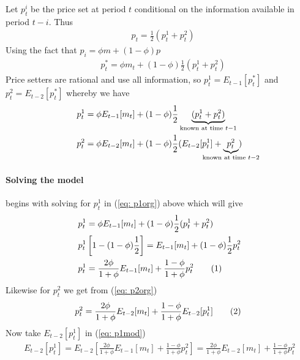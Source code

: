 \documentclass[12pt, a4paper]{article}
\begin{document}
\begin{spacing}{1.213}
Let $p_t^i$ be the price set at period $t$ conditional on the information available in period $t-i$. Thus
\begin{align*}
&p_t = \frac{1}{2}(p_t^1 + p_t^2)
\end{align*}
Using the fact that $p_i = \phi m + (1-\phi) p$
\begin{align*}
& p_t^* = \phi m_t + (1-\phi)\frac{1}{2}(p_t^1 + p_t^2)
\end{align*}
Price setters are rational and use all information, so $p_t^1 = E_{t-1}[p_t^*]$ and $p_t^2 = E_{t-2}[p_t^*]$ whereby we have
\begin{align}
&p_t^1 = \phi E_{t-1}[m_t] + (1-\phi) \frac{1}{2} \underbrace{(p_t^1 + p_t^2)}_{\textrm{known at time }t-1} \label{eq: p1org} \\
& p_t^2 = \phi E_{t-2}[m_t] + (1-\phi) \frac{1}{2} (E_{t-2}[p_t^1] +\underbrace{ p_t^2}_{\mathclap{\textrm{known at time }t-2}}) \label{eq: p2org}
\end{align}
\paragraph{Solving the model} begins with solving for $p_t^1$ in (\ref{eq: p1org}) above which will give
\begin{align*}
&p_t^1 = \phi E_{t-1}[m_t] + (1-\phi) \frac{1}{2} (p_t^1 + p_t^2) \\
& p_t^1 \left[
1- (1-\phi)\frac{1}{2}
\right] = E_{t-1}[m_t] + (1-\phi) \frac{1}{2}  p_t^2 \\
& p_t^1 = \frac{2\phi}{1+\phi} E_{t-1}[m_t] + \frac{1-\phi}{1+\phi} p_t^2
  \stepcounter{equation}\tag{\theequation}\label{eq: p1mod}\
\end{align*}
Likewise for $p_t^2$ we get from (\ref{eq: p2org})
\begin{align*}
p_t^2 = \frac{2\phi}{1+\phi} E_{t-2}[m_t] + \frac{1-\phi}{1+\phi} E_{t-2}[p_t^1]   \stepcounter{equation}\tag{\theequation}\label{eq: p2mod}\
\end{align*}
Now take $E_{t-2}[p_t^1]$ in (\ref{eq: p1mod})
\begin{align*}
E_{t-2}[p_t^1] = E_{t-2}
\left[
\frac{2 \phi}{1+\phi} E_{t-1}[m_t] + \frac{1-\phi}{1+\phi} p_t^2
\right]
= \frac{2 \phi}{1+\phi} E_{t-2}[m_t] + \frac{1-\phi}{1+\phi} p_t^2
\end{align*}


\end{spacing}
\end{document}
